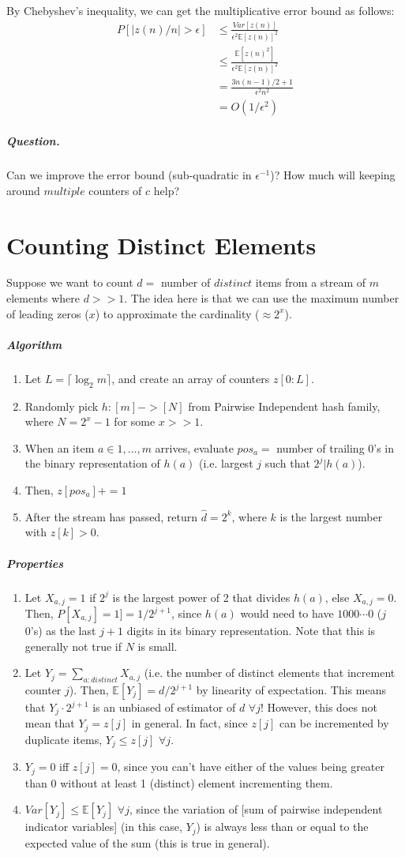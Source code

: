 \documentclass[12pt]{article}
\begin{document}
By Chebyshev's inequality, we can get the multiplicative error bound as follows:
\begin{equation}
\begin{split}
P[|z(n)/n|>\epsilon]&\leq\frac{Var[z(n)]}{\epsilon^2\mathbb{E}[z(n)]^2}\\
&\leq\frac{\mathbb{E}[z(n)^2]}{\epsilon^2\mathbb{E}[z(n)]^2}\\
&=\frac{3n(n-1)/2+1}{\epsilon^2n^2}\\
&=O(1/\epsilon^2)
\end{split}
\end{equation}
\subparagraph{Question.} Can we improve the error bound (sub-quadratic in $\epsilon^{-1}$)? How much will keeping around $multiple$ counters of $c$ help?
\section{Counting Distinct Elements}
Suppose we want to count $d=$ number of $distinct$ items from a stream of $m$ elements where $d>>1$. The idea here is that we can use the maximum number of leading zeros ($x$) to approximate the cardinality ($\approx2^x$).
\subparagraph{Algorithm}
\begin{enumerate}
\item Let $L=\lceil\log_2m\rceil$, and create an array of counters $z[0:L]$.
\item Randomly pick $h:[m]->[N]$ from Pairwise Independent hash family, where $N=2^x-1$ for some $x>>1$.
\item When an item $a\in{1,\ldots,m}$ arrives, evaluate $pos_a=$ number of trailing 0's in the binary representation of $h(a)$ (i.e. largest $j$ such that $2^j|h(a)$).
\item Then, $z[pos_a]+=1$
\item After the stream has passed, return $\hat{d}=2^k$, where $k$ is the largest number with $z[k]>0$.
\end{enumerate}
\subparagraph{Properties}
\begin{enumerate}
\item Let $X_{a,j}=1$ if $2^j$ is the largest power of 2 that divides $h(a)$, else $X_{a,j}=0$. Then, $P[X_{a,j}]=1]=1/2^{j+1}$, since $h(a)$ would need to have $1000\cdots0$ ($j$ 0's) as the last $j+1$ digits in its binary representation. Note that this is generally not true if $N$ is small.
\item Let $Y_j=\sum_{a:distinct}X_{a,j}$ (i.e. the number of distinct elements that increment counter $j$). Then, $\mathbb{E}[Y_j]=d/2^{j+1}$ by linearity of expectation. This means that $Y_j\cdot2^{j+1}$ is an unbiased of estimator of $d$ $\forall j$! However, this does not mean that $Y_j=z[j]$ in general. In fact, since $z[j]$ can be incremented by duplicate items, $Y_j\leq z[j]$ $\forall j$.
\item $Y_j=0$ iff $z[j]=0$, since you can't have either of the values being greater than 0 without at least 1 (distinct) element incrementing them.
\item $Var[Y_j]\leq\mathbb{E}[Y_j]$ $\forall j$, since the variation of [sum of pairwise independent indicator variables] (in this case, $Y_j$) is always less than or equal to the expected value of the sum (this is true in general).
\end{enumerate}
\end{document}
